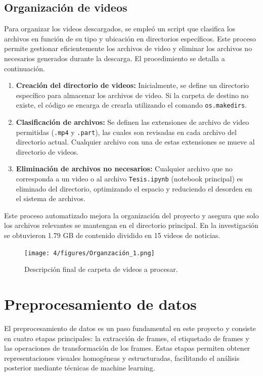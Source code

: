 \subsection{Organización de videos}

Para organizar los videos descargados, se empleó un script que clasifica los archivos en función de su tipo y ubicación en directorios específicos. Este proceso permite gestionar eficientemente los archivos de video y eliminar los archivos no necesarios generados durante la descarga. El procedimiento se detalla a continuación.

\begin{enumerate}
    \item \textbf{Creación del directorio de videos:} Inicialmente, se define un directorio específico para almacenar los archivos de video. Si la carpeta de destino no existe, el código se encarga de crearla utilizando el comando \texttt{os.makedirs}.
    
    \item \textbf{Clasificación de archivos:} Se definen las extensiones de archivo de video permitidas (\texttt{.mp4} y \texttt{.part}), las cuales son revisadas en cada archivo del directorio actual. Cualquier archivo con una de estas extensiones se mueve al directorio de videos.
    
    \item \textbf{Eliminación de archivos no necesarios:} Cualquier archivo que no corresponda a un video o al archivo \texttt{Tesis.ipynb} (notebook principal) es eliminado del directorio, optimizando el espacio y reduciendo el desorden en el sistema de archivos.
\end{enumerate}

Este proceso automatizado mejora la organización del proyecto y asegura que solo los archivos relevantes se mantengan en el directorio principal. En la investigación se obtuvieron 1.79 GB de contenido dividido en 15 videos de noticias.

\begin{figure}[H]
    \centering
    \texttt{[image: 4/figures/Organzación\_1.png]}
    \caption{Descripción final de carpeta de videos a procesar.}
    \label{fig:convolucion}
\end{figure}

\section{Preprocesamiento de datos}

El preprocesamiento de datos es un paso fundamental en este proyecto y consiste en cuatro etapas principales: la extracción de frames, el etiquetado de frames y las operaciones de transformación de los frames. Estas etapas permiten obtener representaciones visuales homogéneas y estructuradas, facilitando el análisis posterior mediante técnicas de machine learning.

